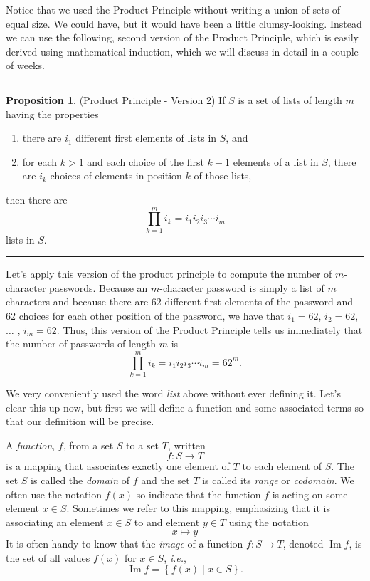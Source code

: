 \documentclass[12pt, letterpaper]{article}
\theoremstyle{definition}
\newtheorem{propt}{Proposition}
\newenvironment{prop}[1]{%
    \vspace*{0.2in}
    ~\newline\noindent
    \begin{minipage}{\linewidth}
    \rule{\textwidth}{2pt}
        \begin{propt}
}
{%
        \end{propt}
    \rule{\textwidth}{2pt}
    \end{minipage}
    \vspace*{0.2in}
    \linebreak
}
\DeclareMathOperator{\Ima}{Im}
\begin{document}
\clearpage\pagebreak\noindent
Notice that we used the Product Principle without writing a union of sets of
equal size. We could have, but it would have been a little clumsy-looking.
Instead we can use the following, second version of the Product Principle,
which is easily derived using mathematical induction, which we will discuss
in detail in a couple of weeks.
\begin{prop}
    \textbf{(Product Principle - Version 2)}
    If $S$ is a set of lists of length $m$ having the properties
    \begin{enumerate}
        \item there are $i_{1}$ different first elements of lists in $S$, and
        \item for each $k>1$ and each choice of the first $k-1$ elements of a
              list in $S$, there are $i_{k}$ choices of elements in position $k$ of
              those lists,
    \end{enumerate}
    then there are
    \begin{equation*}
        \prod_{k=1}^{m}i_{k} = i_{1} i_{2} i_{3} \cdots i_{m}
    \end{equation*}
    lists in $S$.
\end{prop}
Let's apply this version of the product principle to compute the number
of $m$-character passwords. Because an $m$-character password is simply a list
of $m$ characters and because there are 62 different first elements of the
password and 62 choices for each other position of the password, we have
that $i_{1} = 62$, $i_{2} = 62$, $\dots$ , $i_{m} = 62$. Thus, this version of
the Product Principle tells us immediately that the number of passwords of
length $m$ is
\begin{equation*}
    \prod_{k=1}^{m}i_{k} = i_{1} i_{2} i_{3} \cdots i_{m} = 62^{m}.
\end{equation*}

\clearpage\pagebreak\noindent
We very conveniently used the word \emph{list} above without ever defining it.
Let's clear this up now, but first we will define a function and some
associated terms so that our definition will be precise.

A \emph{function}, $f$, from a set $S$ to a set $T$, written
\begin{equation*}
    f : S \to T
\end{equation*}
is a mapping that associates exactly one element of $T$ to each element of $S$.
The set $S$ is called the \emph{domain} of $f$ and the set $T$ is called its
\emph{range} or \emph{codomain}. We often use the notation $f(x)$ so indicate
that the function $f$ is acting on some element $x \in S$. Sometimes we refer
to this mapping, emphasizing that it is associating an element $x \in S$ to
and element $y \in T$ using the notation
\begin{equation*}
    x \mapsto y
\end{equation*}
It is often handy to know that the \emph{image} of a function $f : S \to T$,
denoted $\Ima f$, is the set of all values $f(x)$ for $x \in S$, \emph{i.e.},
\begin{equation*}
    \Ima f = \left\{ f(x) \;|\; x \in S \right\}.
\end{equation*}
\end{document}
